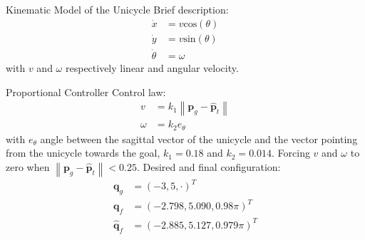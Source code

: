 \documentclass[10pt]{beamer}
\begin{document}
    \begin{frame}{Kinematic Model of the Unicycle}
        Brief description:
        \begin{align*}
            \dot{x} &= v \text{cos}(\theta) \\
            \dot{y} &= v \text{sin}(\theta) \\
            \dot{\theta} &= \omega
        \end{align*}
        with $v$ and $\omega$ respectively linear and angular velocity.
    \end{frame}

    \begin{frame}{Proportional Controller}
        \justifying
        Control law:
        \begin{align*}
            v &= k_1 \left\| \bm{p}_g - \bm{\hat{p}}_t \right\| \\
            \omega &= k_2 e_{\theta}
        \end{align*}
        with $e_\theta$ angle between the sagittal vector of the unicycle
        and the vector pointing from the unicycle towards the goal, $k_1 =
        0.18$ and $k_2 = 0.014$. Forcing $v$ and $\omega$ to zero when
        $\left\|\bm{p}_g - \bm{\hat{p}}_t \right\| < 0.25$.
        Desired and final configuration:
        \begin{align*}
            \bm{q}_g &= (-3, 5, \cdot)^T \\
            \bm{q}_f &= (-2.798, 5.090, 0.98\pi)^T \\
            \bm{\hat{q}}_f &= (-2.885, 5.127, 0.979\pi)^T
        \end{align*}
    \end{frame}

\end{document}
